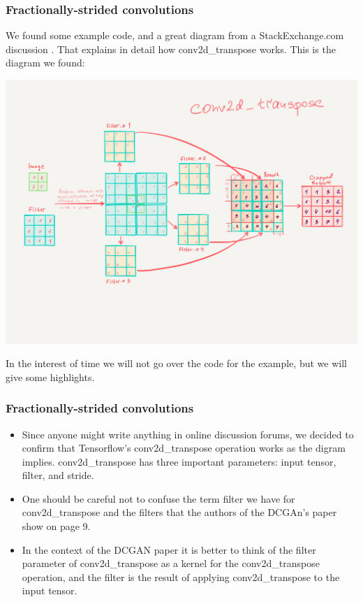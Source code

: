 \documentclass{beamer}
\begin{document}

\begin{frame}
\frametitle{Fractionally-strided convolutions}
We found some example code, and a great diagram from a StackExchange.com discussion 
\cite{stackExConv}. That explains in detail how conv2d\_transpose works.
This is the diagram we found:

\includegraphics[scale=0.25] {conv2d_transpose-example}


In the interest of time we will not go over the code for the example, but we
will give some highlights.

\end{frame}

\begin{frame}
\frametitle{Fractionally-strided convolutions}
\begin{itemize}
\item Since anyone might write anything in online discussion forums, we decided to 
confirm that Tensorflow's conv2d\_transpose operation works as the digram implies.
conv2d\_transpose has three important parameters: input tensor, 
filter, and stride. 

\item One should be careful not to confuse the term filter we
have for conv2d\_transpose and the filters that the authors of the DCGAn's paper
show on page 9. 

\item In the context of the DCGAN paper it is better to think of the filter
parameter of conv2d\_transpose  as a kernel for the conv2d\_transpose operation,
and the filter is the result of applying conv2d\_transpose to the input tensor. 
\end{itemize}
\end{frame}
\end{document}
